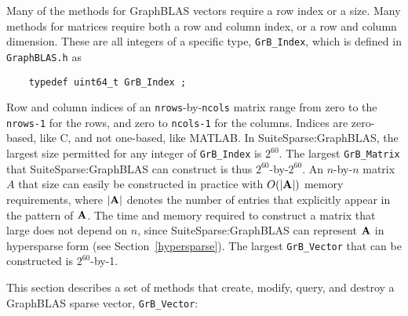\documentclass[12pt]{article}
\begin{document}
Many of the methods for GraphBLAS vectors require a row index or a size.  Many
methods for matrices require both a row and column index, or a row and column
dimension.  These are all integers of a specific type, \verb'GrB_Index',
which is defined in \verb'GraphBLAS.h' as

    {\footnotesize
    \begin{verbatim}
    typedef uint64_t GrB_Index ; \end{verbatim}}

Row and column indices of an \verb'nrows'-by-\verb'ncols' matrix range from
zero to the \verb'nrows-1' for the rows, and zero to \verb'ncols-1' for the
columns.  Indices are zero-based, like C, and not one-based, like MATLAB.  In
SuiteSparse:GraphBLAS, the largest size permitted for any integer of
\verb'GrB_Index' is $2^{60}$.  The largest \verb'GrB_Matrix' that
SuiteSparse:GraphBLAS can construct is thus $2^{60}$-by-$2^{60}$.  An
$n$-by-$n$ matrix $A$ that size can easily be constructed in practice with
$O(|{\bf A}|)$ memory requirements, where $|{\bf A}|$ denotes the number of
entries that explicitly appear in the pattern of ${\bf A}$.  The time and
memory required to construct a matrix that large does not depend on $n$, since
SuiteSparse:GraphBLAS can represent ${\bf A}$ in hypersparse form (see
Section~\ref{hypersparse}).  The largest \verb'GrB_Vector' that can be
constructed is $2^{60}$-by-1.

This section describes a set of methods that create, modify, query,
and destroy a GraphBLAS sparse vector, \verb'GrB_Vector':
\end{document}
